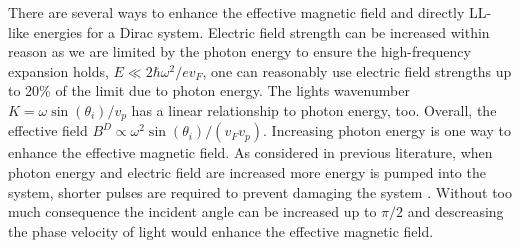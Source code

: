There are several ways to enhance the effective magnetic field and directly LL-like energies for a Dirac system.
Electric field strength can be increased within reason as we are limited by the photon energy to ensure the high-frequency expansion holds, $E \ll 2\hbar\omega^2/e v_F$, one can reasonably use electric field strengths up to 20\% of the limit due to photon energy.
The lights wavenumber $K= \omega \sin{(\theta_i)} / v_p$ has a linear relationship to photon energy, too.
Overall, the effective field $B^D \propto \omega^2 \sin{(\theta_i)} / (v_F v_p)$.
Increasing photon energy is one way to enhance the effective magnetic field.
As considered in previous literature, when photon energy and electric field are increased more energy is pumped into the system, shorter pulses are required to prevent damaging the system \cite{YHW, JWM}.
Without too much consequence the incident angle can be increased up to $\pi/2$ and descreasing the phase velocity of light would enhance the effective magnetic field.

